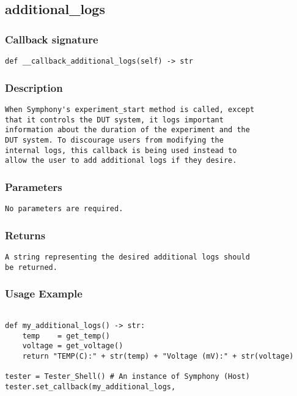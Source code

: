 \subsection{additional\_logs}

\subsubsection{Callback signature}
\begin{lstlisting}
def __callback_additional_logs(self) -> str
\end{lstlisting}

\subsubsection{Description}
\begin{lstlisting}[mathescape=true, keywordstyle=\color{black}, showstringspaces=false]
When Symphony's experiment_start method is called, except 
that it controls the DUT system, it logs important 
information about the duration of the experiment and the 
DUT system. To discourage users from modifying the 
internal logs, this callback is being used instead to 
allow the user to add additional logs if they desire. 
\end{lstlisting}

\subsubsection{Parameters}
\begin{lstlisting}[mathescape=true, keywordstyle=\color{black}]
No parameters are required.
\end{lstlisting}

\subsubsection{Returns}
\begin{lstlisting}[mathescape=true, keywordstyle=\color{black}]
A string representing the desired additional logs should 
be returned.
\end{lstlisting}

\subsubsection{Usage Example}
\begin{lstlisting}

def my_additional_logs() -> str:
    temp    = get_temp()
    voltage = get_voltage()
    return "TEMP(C):" + str(temp) + "Voltage (mV):" + str(voltage)

tester = Tester_Shell() # An instance of Symphony (Host)
tester.set_callback(my_additional_logs,


\end{lstlisting}
